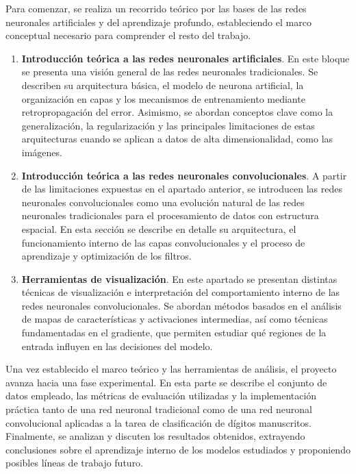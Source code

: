 Para comenzar, se realiza un recorrido teórico por las bases de las redes neuronales artificiales y del aprendizaje profundo, estableciendo el marco conceptual necesario para comprender el resto del trabajo.

\begin{enumerate}
	\item \textbf{Introducción teórica a las redes neuronales artificiales}.
	En este bloque se presenta una visión general de las redes neuronales tradicionales. Se describen su arquitectura básica, el modelo de neurona artificial, la organización en capas y los mecanismos de entrenamiento mediante retropropagación del error. Asimismo, se abordan conceptos clave como la generalización, la regularización y las principales limitaciones de estas arquitecturas cuando se aplican a datos de alta dimensionalidad, como las imágenes.

	\item \textbf{Introducción teórica a las redes neuronales convolucionales}.
	A partir de las limitaciones expuestas en el apartado anterior, se introducen las redes neuronales convolucionales como una evolución natural de las redes neuronales tradicionales para el procesamiento de datos con estructura espacial. En esta sección se describe en detalle su arquitectura, el funcionamiento interno de las capas convolucionales y el proceso de aprendizaje y optimización de los filtros.

	\item \textbf{Herramientas de visualización}.
	En este apartado se presentan distintas técnicas de visualización e interpretación del comportamiento interno de las redes neuronales convolucionales. Se abordan métodos basados en el análisis de mapas de características y activaciones intermedias, así como técnicas fundamentadas en el gradiente, que permiten estudiar qué regiones de la entrada influyen en las decisiones del modelo.
\end{enumerate}

Una vez establecido el marco teórico y las herramientas de análisis, el proyecto avanza hacia una fase experimental. En esta parte se describe el conjunto de datos empleado, las métricas de evaluación utilizadas y la implementación práctica tanto de una red neuronal tradicional como de una red neuronal convolucional aplicadas a la tarea de clasificación de dígitos manuscritos. Finalmente, se analizan y discuten los resultados obtenidos, extrayendo conclusiones sobre el aprendizaje interno de los modelos estudiados y proponiendo posibles líneas de trabajo futuro.

